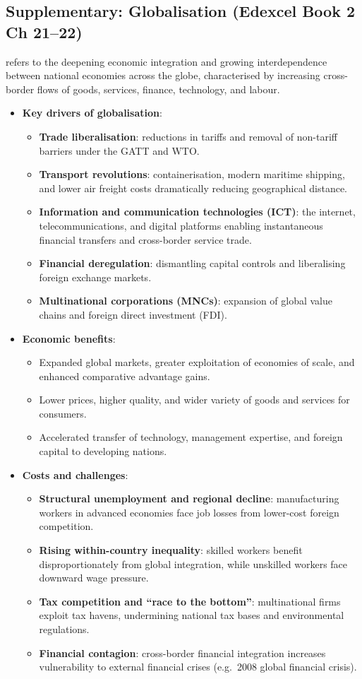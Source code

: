 \subsection{Supplementary: Globalisation (Edexcel Book 2 Ch 21--22)}
 refers to the deepening economic integration and growing interdependence between national economies across the globe, characterised by increasing cross-border flows of goods, services, finance, technology, and labour.
\begin{itemize}
  \item \textbf{Key drivers of globalisation}:
  \begin{itemize}
    \item \textbf{Trade liberalisation}: reductions in tariffs and removal of non-tariff barriers under the GATT and WTO.
    \item \textbf{Transport revolutions}: containerisation, modern maritime shipping, and lower air freight costs dramatically reducing geographical distance.
    \item \textbf{Information and communication technologies (ICT)}: the internet, telecommunications, and digital platforms enabling instantaneous financial transfers and cross-border service trade.
    \item \textbf{Financial deregulation}: dismantling capital controls and liberalising foreign exchange markets.
    \item \textbf{Multinational corporations (MNCs)}: expansion of global value chains and foreign direct investment (FDI).
  \end{itemize}
  \item \textbf{Economic benefits}:
  \begin{itemize}
    \item Expanded global markets, greater exploitation of economies of scale, and enhanced comparative advantage gains.
    \item Lower prices, higher quality, and wider variety of goods and services for consumers.
    \item Accelerated transfer of technology, management expertise, and foreign capital to developing nations.
  \end{itemize}
  \item \textbf{Costs and challenges}:
  \begin{itemize}
    \item \textbf{Structural unemployment and regional decline}: manufacturing workers in advanced economies face job losses from lower-cost foreign competition.
    \item \textbf{Rising within-country inequality}: skilled workers benefit disproportionately from global integration, while unskilled workers face downward wage pressure.
    \item \textbf{Tax competition and ``race to the bottom''}: multinational firms exploit tax havens, undermining national tax bases and environmental regulations.
    \item \textbf{Financial contagion}: cross-border financial integration increases vulnerability to external financial crises (e.g.\ 2008 global financial crisis).
  \end{itemize}
\end{itemize}
